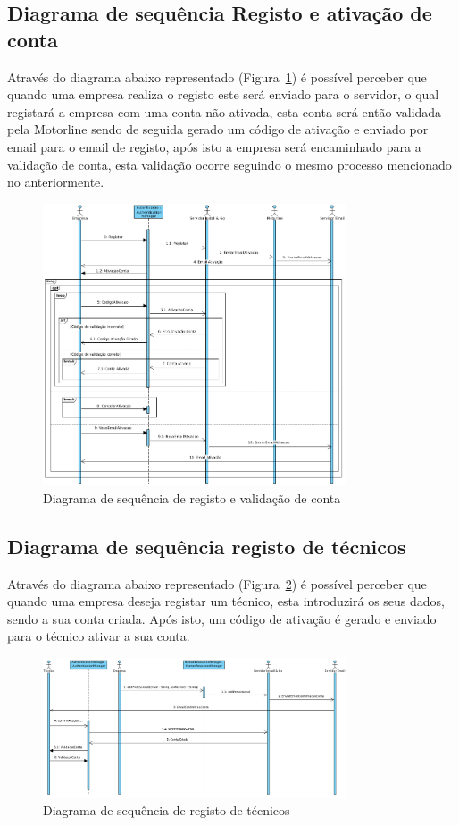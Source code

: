 \newpage

\subsection{Diagrama de sequência Registo e ativação de conta}

Através do diagrama abaixo representado (Figura~\ref{fig:44}) é possível perceber que quando uma
empresa realiza o registo este será enviado para o servidor, o qual registará a empresa com uma 
conta não ativada, esta conta será então validada pela Motorline sendo de seguida
gerado um código de ativação e enviado por email para o 
email de registo, após isto a empresa será encaminhado para a validação de conta, esta validação 
ocorre seguindo o mesmo processo mencionado no anteriormente.


\begin{figure}[htb]
    \centering
    \includegraphics[width=0.8\textwidth]{images/diagramas/sequencia/diagrama_registo.png}
    \caption{Diagrama de sequência de registo e validação de conta}
    \label{fig:44}
\end{figure}

\newpage

\subsection{Diagrama de sequência registo de técnicos}

Através do diagrama abaixo representado (Figura~\ref{fig:45}) é possível perceber que quando uma
empresa deseja registar um técnico, esta introduzirá os seus dados, sendo a sua conta criada. Após isto, 
um código de ativação é gerado e enviado para o técnico ativar a sua conta.

\begin{figure}[htb]
    \centering
    \includegraphics[width=0.8\textwidth]{images/diagramas/sequencia/registo_tecnico.png}
    \caption{Diagrama de sequência de registo de técnicos}
    \label{fig:45}
\end{figure}